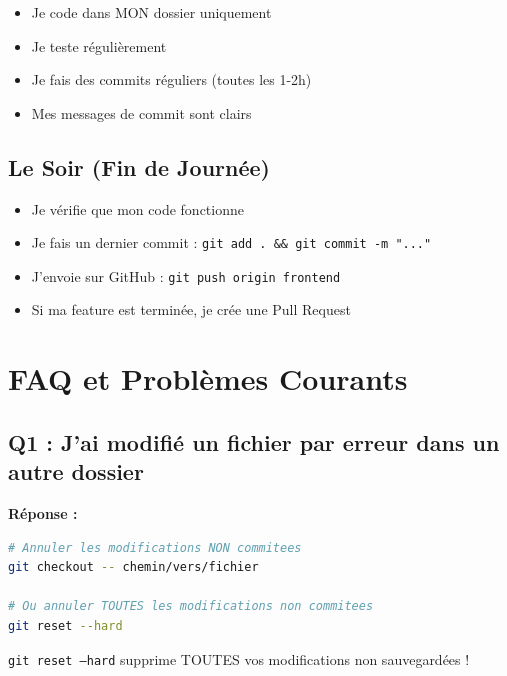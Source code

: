 \documentclass[11pt,a4paper]{article}
\begin{document}
\begin{itemize}
    \item[$\square$] Je code dans MON dossier uniquement
    \item[$\square$] Je teste régulièrement
    \item[$\square$] Je fais des commits réguliers (toutes les 1-2h)
    \item[$\square$] Mes messages de commit sont clairs
\end{itemize}

\subsection{Le Soir (Fin de Journée)}

\begin{itemize}
    \item[$\square$] Je vérifie que mon code fonctionne
    \item[$\square$] Je fais un dernier commit : \texttt{git add . \&\& git commit -m "..."}
    \item[$\square$] J'envoie sur GitHub : \texttt{git push origin frontend}
    \item[$\square$] Si ma feature est terminée, je crée une Pull Request
\end{itemize}

\clearpage

\section{FAQ et Problèmes Courants}
\label{sec:faq}

\subsection{Q1 : J'ai modifié un fichier par erreur dans un autre dossier}

\textbf{Réponse :}

\begin{lstlisting}[language=bash]
# Annuler les modifications NON commitees
git checkout -- chemin/vers/fichier

# Ou annuler TOUTES les modifications non commitees
git reset --hard
\end{lstlisting}

\begin{important}[Attention]
\texttt{git reset --hard} supprime TOUTES vos modifications non sauvegardées !
\end{important}
\end{document}
